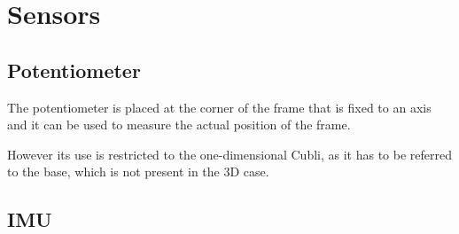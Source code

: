 \section{Sensors}
\label{sec:Sensors}

\subsection{Potentiometer}
The potentiometer is placed at the corner of the frame that is fixed to an axis and it can be used to measure the actual position of the frame.

However its use is restricted to the one-dimensional Cubli, as it has to be referred to the base, which is not present in the 3D case.


\subsection{IMU}
